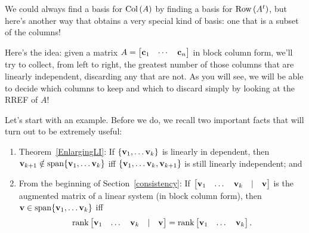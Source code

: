 We could always find a basis for $\operatorname{Col\,}(A)$ by finding a basis  for $\operatorname{Row\,}(A^t)$, but here's another way that obtains a very special kind of basis: one that is a subset of the columns!

Here's the idea: given a matrix $A=\left[ \begin{matrix} \mathbf{c}_1& \cdots & \mathbf{c}_n \end{matrix} \right]$ in block column form, we'll try to collect, from left to right, the greatest number of  those columns that are linearly independent, discarding any that are not. As you will see, we will be able to decide which columns to keep and which to discard simply by looking at the RREF of $A$!

Let's start with an example. Before we do, we recall two important facts that will turn out to be extremely useful:
\begin{enumerate} [(1)]
\item Theorem~\ref{EnlargingLI}: If $\{\mathbf{v}_1, \dots \mathbf{v}_k \}$ is linearly in dependent, then $\mathbf{v}_{k+1} \notin \textrm{span}\{\mathbf{v}_1, \dots \mathbf{v}_k\}$ iff $\{\mathbf{v}_1, \dots \mathbf{v}_k, \mathbf{v}_{k+1} \}$ is still linearly independent; and 
\medskip
\item From the beginning of Section~\ref{consistency}: If $\left[ \begin{matrix} \mathbf{v}_1& \dots &\mathbf{v}_k&|& \mathbf{v} \end{matrix} \right]$ is the augmented matrix of a linear system (in block column form), then $\mathbf{v}\in \textrm{span}\{\mathbf{v}_1, \dots \mathbf{v}_k\}$ iff $$\operatorname{rank}\left[ \begin{matrix} \mathbf{v}_1& \dots &\mathbf{v}_k&|& \mathbf{v} \end{matrix} \right]=\operatorname{rank} \left[ \begin{matrix} \mathbf{v}_1& \dots &\mathbf{v}_k \end{matrix} \right].$$
\end{enumerate}

